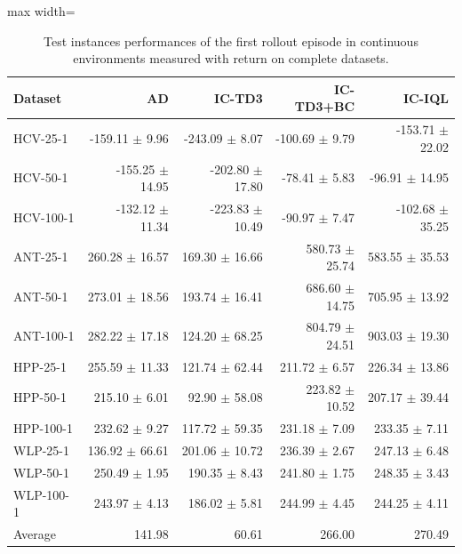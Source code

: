 \documentclass{article}
\begin{document}
\begin{table}[ht]
    \label{tab:}
    \begin{center}
    \caption{Test instances performances of the first rollout episode in continuous environments measured with return on complete datasets.}
    \begin{small}
    \begin{adjustbox}{max width=\columnwidth}
		\begin{tabular}{l|rrrr}
		\toprule
	\textbf{Dataset} & \textbf{AD} & \textbf{IC-TD3} & \textbf{IC-TD3+BC} & \textbf{IC-IQL}\\
\midrule
HCV-25-1 & -159.11 $\pm$ 9.96 & -243.09 $\pm$ 8.07 & -100.69 $\pm$ 9.79 & -153.71 $\pm$ 22.02\\
HCV-50-1 & -155.25 $\pm$ 14.95 & -202.80 $\pm$ 17.80 & -78.41 $\pm$ 5.83 & -96.91 $\pm$ 14.95\\
HCV-100-1 & -132.12 $\pm$ 11.34 & -223.83 $\pm$ 10.49 & -90.97 $\pm$ 7.47 & -102.68 $\pm$ 35.25\\
ANT-25-1 & 260.28 $\pm$ 16.57 & 169.30 $\pm$ 16.66 & 580.73 $\pm$ 25.74 & 583.55 $\pm$ 35.53\\
ANT-50-1 & 273.01 $\pm$ 18.56 & 193.74 $\pm$ 16.41 & 686.60 $\pm$ 14.75 & 705.95 $\pm$ 13.92\\
ANT-100-1 & 282.22 $\pm$ 17.18 & 124.20 $\pm$ 68.25 & 804.79 $\pm$ 24.51 & 903.03 $\pm$ 19.30\\
HPP-25-1 & 255.59 $\pm$ 11.33 & 121.74 $\pm$ 62.44 & 211.72 $\pm$ 6.57 & 226.34 $\pm$ 13.86\\
HPP-50-1 & 215.10 $\pm$ 6.01 & 92.90 $\pm$ 58.08 & 223.82 $\pm$ 10.52 & 207.17 $\pm$ 39.44\\
HPP-100-1 & 232.62 $\pm$ 9.27 & 117.72 $\pm$ 59.35 & 231.18 $\pm$ 7.09 & 233.35 $\pm$ 7.11\\
WLP-25-1 & 136.92 $\pm$ 66.61 & 201.06 $\pm$ 10.72 & 236.39 $\pm$ 2.67 & 247.13 $\pm$ 6.48\\
WLP-50-1 & 250.49 $\pm$ 1.95 & 190.35 $\pm$ 8.43 & 241.80 $\pm$ 1.75 & 248.35 $\pm$ 3.43\\
WLP-100-1 & 243.97 $\pm$ 4.13 & 186.02 $\pm$ 5.81 & 244.99 $\pm$ 4.45 & 244.25 $\pm$ 4.11\\
\midrule
Average & 141.98 & 60.61 & 266.00 & 270.49\\
\end{tabular}
        \end{adjustbox}
    \end{small}
    \end{center}
    \vskip -0.1in
\end{table}
\FloatBarrier
\end{document}
